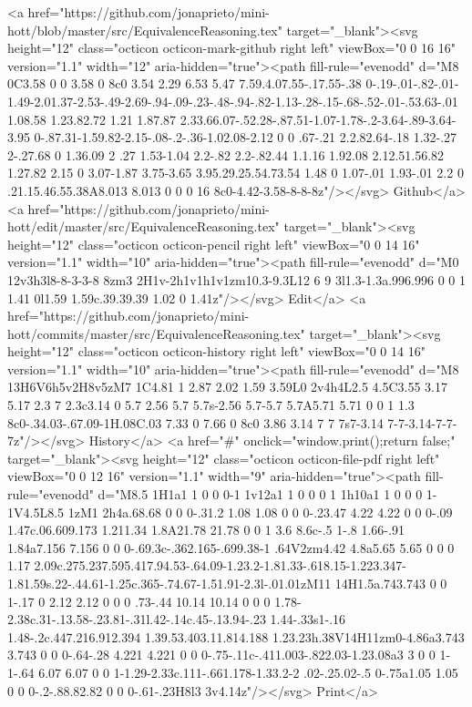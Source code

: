       <a href="https://github.com/jonaprieto/mini-hott/blob/master/src/EquivalenceReasoning.tex" target="_blank"><svg height="12" class="octicon octicon-mark-github right left" viewBox="0 0 16 16" version="1.1" width="12" aria-hidden="true"><path fill-rule="evenodd" d="M8 0C3.58 0 0 3.58 0 8c0 3.54 2.29 6.53 5.47 7.59.4.07.55-.17.55-.38 0-.19-.01-.82-.01-1.49-2.01.37-2.53-.49-2.69-.94-.09-.23-.48-.94-.82-1.13-.28-.15-.68-.52-.01-.53.63-.01 1.08.58 1.23.82.72 1.21 1.87.87 2.33.66.07-.52.28-.87.51-1.07-1.78-.2-3.64-.89-3.64-3.95 0-.87.31-1.59.82-2.15-.08-.2-.36-1.02.08-2.12 0 0 .67-.21 2.2.82.64-.18 1.32-.27 2-.27.68 0 1.36.09 2 .27 1.53-1.04 2.2-.82 2.2-.82.44 1.1.16 1.92.08 2.12.51.56.82 1.27.82 2.15 0 3.07-1.87 3.75-3.65 3.95.29.25.54.73.54 1.48 0 1.07-.01 1.93-.01 2.2 0 .21.15.46.55.38A8.013 8.013 0 0 0 16 8c0-4.42-3.58-8-8-8z"/></svg> Github</a>
      <a href="https://github.com/jonaprieto/mini-hott/edit/master/src/EquivalenceReasoning.tex" target="_blank"><svg height="12" class="octicon octicon-pencil right left" viewBox="0 0 14 16" version="1.1" width="10" aria-hidden="true"><path fill-rule="evenodd" d="M0 12v3h3l8-8-3-3-8 8zm3 2H1v-2h1v1h1v1zm10.3-9.3L12 6 9 3l1.3-1.3a.996.996 0 0 1 1.41 0l1.59 1.59c.39.39.39 1.02 0 1.41z"/></svg> Edit</a>
      <a href="https://github.com/jonaprieto/mini-hott/commits/master/src/EquivalenceReasoning.tex" target="_blank"><svg height="12" class="octicon octicon-history right left" viewBox="0 0 14 16" version="1.1" width="10" aria-hidden="true"><path fill-rule="evenodd" d="M8 13H6V6h5v2H8v5zM7 1C4.81 1 2.87 2.02 1.59 3.59L0 2v4h4L2.5 4.5C3.55 3.17 5.17 2.3 7 2.3c3.14 0 5.7 2.56 5.7 5.7s-2.56 5.7-5.7 5.7A5.71 5.71 0 0 1 1.3 8c0-.34.03-.67.09-1H.08C.03 7.33 0 7.66 0 8c0 3.86 3.14 7 7 7s7-3.14 7-7-3.14-7-7-7z"/></svg> History</a>
      <a  href="#" onclick="window.print();return false;" target="_blank"><svg height="12" class="octicon octicon-file-pdf right left" viewBox="0 0 12 16" version="1.1" width="9" aria-hidden="true"><path fill-rule="evenodd" d="M8.5 1H1a1 1 0 0 0-1 1v12a1 1 0 0 0 1 1h10a1 1 0 0 0 1-1V4.5L8.5 1zM1 2h4a.68.68 0 0 0-.31.2 1.08 1.08 0 0 0-.23.47 4.22 4.22 0 0 0-.09 1.47c.06.609.173 1.211.34 1.8A21.78 21.78 0 0 1 3.6 8.6c-.5 1-.8 1.66-.91 1.84a7.156 7.156 0 0 0-.69.3c-.362.165-.699.38-1 .64V2zm4.42 4.8a5.65 5.65 0 0 0 1.17 2.09c.275.237.595.417.94.53-.64.09-1.23.2-1.81.33-.618.15-1.223.347-1.81.59s.22-.44.61-1.25c.365-.74.67-1.51.91-2.3l-.01.01zM11 14H1.5a.743.743 0 0 1-.17 0 2.12 2.12 0 0 0 .73-.44 10.14 10.14 0 0 0 1.78-2.38c.31-.13.58-.23.81-.31l.42-.14c.45-.13.94-.23 1.44-.33s1-.16 1.48-.2c.447.216.912.394 1.39.53.403.11.814.188 1.23.23h.38V14H11zm0-4.86a3.743 3.743 0 0 0-.64-.28 4.221 4.221 0 0 0-.75-.11c-.411.003-.822.03-1.23.08a3 3 0 0 1-1-.64 6.07 6.07 0 0 1-1.29-2.33c.111-.661.178-1.33.2-2 .02-.25.02-.5 0-.75a1.05 1.05 0 0 0-.2-.88.82.82 0 0 0-.61-.23H8l3 3v4.14z"/></svg> Print</a>
